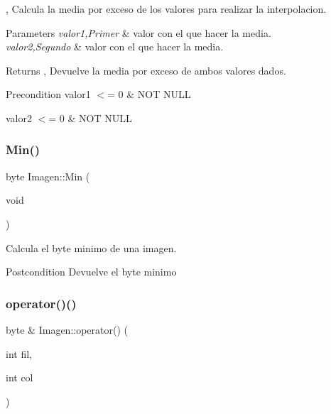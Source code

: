 , Calcula la media por exceso de los valores para realizar la interpolacion. 


\begin{DoxyParams}{Parameters}
{\em valor1,Primer} & valor con el que hacer la media. \\
\hline
{\em valor2,Segundo} & valor con el que hacer la media. \\
\hline
\end{DoxyParams}
\begin{DoxyReturn}{Returns}
, Devuelve la media por exceso de ambos valores dados. 
\end{DoxyReturn}
\begin{DoxyPrecond}{Precondition}
valor1 $<$= 0 \& N\+OT N\+U\+LL 

valor2 $<$= 0 \& N\+OT N\+U\+LL 
\end{DoxyPrecond}
\mbox{\label{class_imagen_adeed73bed8b0ed569e4151ebd26ffe54}} 
\subsubsection{\texorpdfstring{Min()}{Min()}}
{\footnotesize\ttfamily byte Imagen\+::\+Min (\begin{DoxyParamCaption}\item[{void}]{ }\end{DoxyParamCaption})}



Calcula el byte minimo de una imagen. 

\begin{DoxyPostcond}{Postcondition}
Devuelve el byte minimo 
\end{DoxyPostcond}
\mbox{\label{class_imagen_a5bf74bd4c1572323ece102ec67c7e1dd}} 
\subsubsection{\texorpdfstring{operator()()}{operator()()}\hspace{0.1cm}{\footnotesize\ttfamily [1/2]}}
{\footnotesize\ttfamily byte \& Imagen\+::operator() (\begin{DoxyParamCaption}\item[{int}]{fil,  }\item[{int}]{col }\end{DoxyParamCaption})}



